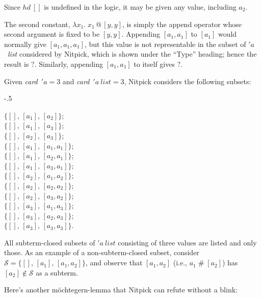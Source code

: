 \documentclass[a4paper,12pt]{article}
\def\unk{{?}}
\renewcommand\_{\hbox{\textunderscore\kern-.05ex}}
\begin{document}
Since $\mathit{hd}~[]$ is undefined in the logic, it may be given any value,
including $a_2$.

The second constant, $\lambda x_1.\; x_1 \mathbin{@} [y, y]$, is simply the
append operator whose second argument is fixed to be $[y, y]$. Appending $[a_1,
a_1]$ to $[a_1]$ would normally give $[a_1, a_1, a_1]$, but this value is not
representable in the subset of $'a$~\textit{list} considered by Nitpick, which
is shown under the ``Type'' heading; hence the result is $\unk$. Similarly,
appending $[a_1, a_1]$ to itself gives $\unk$.

Given \textit{card}~$'a = 3$ and \textit{card}~$'a~\textit{list} = 3$, Nitpick
considers the following subsets:

\kern-.5\smallskipamount %

\prew
\begin{multicols}{3}
$\{[],\, [a_1],\, [a_2]\}$; \\
$\{[],\, [a_1],\, [a_3]\}$; \\
$\{[],\, [a_2],\, [a_3]\}$; \\
$\{[],\, [a_1],\, [a_1, a_1]\}$; \\
$\{[],\, [a_1],\, [a_2, a_1]\}$; \\
$\{[],\, [a_1],\, [a_3, a_1]\}$; \\
$\{[],\, [a_2],\, [a_1, a_2]\}$; \\
$\{[],\, [a_2],\, [a_2, a_2]\}$; \\
$\{[],\, [a_2],\, [a_3, a_2]\}$; \\
$\{[],\, [a_3],\, [a_1, a_3]\}$; \\
$\{[],\, [a_3],\, [a_2, a_3]\}$; \\
$\{[],\, [a_3],\, [a_3, a_3]\}$.
\end{multicols}
\postw

\smallskipamount %

All subterm-closed subsets of $'a~\textit{list}$ consisting of three values
are listed and only those. As an example of a non-subterm-closed subset,
consider $\mathcal{S} = \{[],\, [a_1],\,\allowbreak [a_1, a_2]\}$, and observe
that $[a_1, a_2]$ (i.e., $a_1 \mathbin{\#} [a_2]$) has $[a_2] \notin
\mathcal{S}$ as a subterm.

Here's another m\"ochtegern-lemma that Nitpick can refute without a blink:
\end{document}
